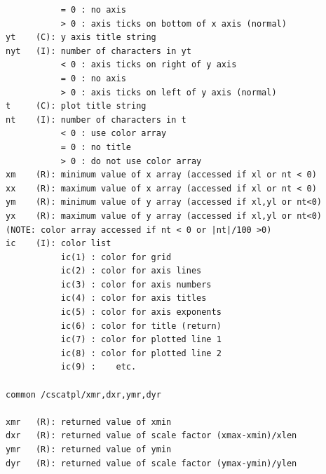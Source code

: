 \documentclass[11pt]{report}
\begin{document}
\begin{verbatim}
           = 0 : no axis
           > 0 : axis ticks on bottom of x axis (normal)
yt    (C): y axis title string
nyt   (I): number of characters in yt
           < 0 : axis ticks on right of y axis
           = 0 : no axis
           > 0 : axis ticks on left of y axis (normal)
t     (C): plot title string
nt    (I): number of characters in t
           < 0 : use color array
           = 0 : no title
           > 0 : do not use color array
xm    (R): minimum value of x array (accessed if xl or nt < 0)
xx    (R): maximum value of x array (accessed if xl or nt < 0)
ym    (R): minimum value of y array (accessed if xl,yl or nt<0)
yx    (R): maximum value of y array (accessed if xl,yl or nt<0)
(NOTE: color array accessed if nt < 0 or |nt|/100 >0)
ic    (I): color list
           ic(1) : color for grid
           ic(2) : color for axis lines
           ic(3) : color for axis numbers
           ic(4) : color for axis titles
           ic(5) : color for axis exponents
           ic(6) : color for title (return)
           ic(7) : color for plotted line 1
           ic(8) : color for plotted line 2
           ic(9) :    etc.

common /cscatpl/xmr,dxr,ymr,dyr

xmr   (R): returned value of xmin
dxr   (R): returned value of scale factor (xmax-xmin)/xlen
ymr   (R): returned value of ymin
dyr   (R): returned value of scale factor (ymax-ymin)/ylen
\end{verbatim}

\newpage
\end{document}
